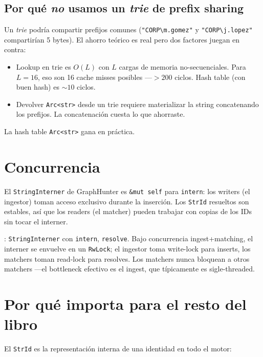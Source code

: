 \subsection{Por qué \emph{no} usamos un \emph{trie} de prefix sharing}

Un \emph{trie} podría compartir prefijos comunes
(\texttt{"CORP\textbackslash{}m.gomez"} y
\texttt{"CORP\textbackslash{}j.lopez"} compartirían 5 bytes). El
ahorro teórico es real pero dos factores juegan en contra:

\begin{itemize}
    \item Lookup en trie es \(O(L)\) con \(L\) cargas de memoria
    no-secuenciales. Para \(L = 16\), eso son 16 cache misses
    posibles ---\(>200\) ciclos. Hash table (con buen hash) es \(\sim
    10\) ciclos.
    \item Devolver \texttt{Arc<str>} desde un trie requiere
    materializar la string concatenando los prefijos. La
    concatenación cuesta lo que ahorraste.
\end{itemize}

\noindent
La hash table \texttt{Arc<str>} gana en práctica.

\section{Concurrencia}

El \texttt{StringInterner} de GraphHunter es \texttt{\&mut self}
para \texttt{intern}: los writers (el ingestor) toman acceso
exclusivo durante la inserción. Los \texttt{StrId} resueltos son
estables, así que los readers (el matcher) pueden trabajar con
copias de los IDs sin tocar el interner.

\begin{enelcodigo}
: \texttt{StringInterner}
con \texttt{intern}, \texttt{resolve}. Bajo concurrencia
ingest+matching, el interner se envuelve en un \texttt{RwLock}; el
ingestor toma write-lock para inserts, los matchers toman
read-lock para resolves. Los matchers nunca bloquean a otros
matchers ---el bottleneck efectivo es el ingest, que típicamente es
sigle-threaded.
\end{enelcodigo}

\section{Por qué importa para el resto del libro}

El \texttt{StrId} es la representación interna de una identidad en
todo el motor:

